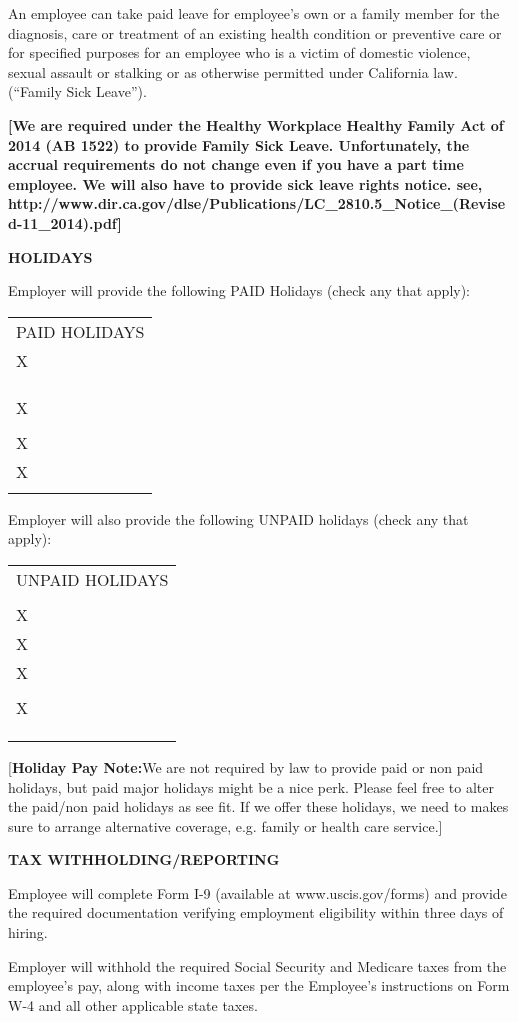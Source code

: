 \documentclass[]{article}
\newcommand{\toprule}{\hrulefill}
\newcommand{\bottomrule}{\hrulefill}
\begin{document}
An employee can take paid leave for employee's own or a family member
for the diagnosis, care or treatment of an existing health condition or
preventive care or for specified purposes for an employee who is a
victim of domestic violence, sexual assault or stalking or as otherwise
permitted under California law. (``Family Sick Leave'').

\textbf{{[}We are required under the Healthy Workplace Healthy Family
Act of 2014 (AB 1522) to provide Family Sick Leave. Unfortunately, the
accrual requirements do not change even if you have a part time
employee. We will also have to provide sick leave rights notice. see,
http://www.dir.ca.gov/dlse/Publications/LC\_2810.5\_Notice\_(Revised-11\_2014).pdf{]}}

\textbf{HOLIDAYS}

Employer will provide the following PAID Holidays (check any that
apply):

\begin{tabular}[c]{@{}l@{}}
\toprule
PAID HOLIDAYS\tabularnewline
X\tabularnewline
\tabularnewline
\tabularnewline
\tabularnewline
X\tabularnewline
\tabularnewline
X\tabularnewline
X\tabularnewline
\bottomrule
\end{tabular}

Employer will also provide the following UNPAID holidays (check any that
apply):

\begin{tabular}[c]{@{}l@{}}
\toprule
UNPAID HOLIDAYS\tabularnewline
\tabularnewline
X\tabularnewline
X\tabularnewline
X\tabularnewline
\tabularnewline
X\tabularnewline
\tabularnewline
\tabularnewline
\bottomrule
\end{tabular}

{[}\textbf{Holiday Pay Note:}We are not required by law to provide paid
or non paid holidays, but paid major holidays might be a nice perk.
Please feel free to alter the paid/non paid holidays as see fit. If we
offer these holidays, we need to makes sure to arrange alternative
coverage, e.g. family or health care service.{]}

\textbf{TAX WITHHOLDING/REPORTING}

Employee will complete Form I-9 (available at www.uscis.gov/forms) and
provide the required documentation verifying employment eligibility
within three days of hiring.

Employer will withhold the required Social Security and Medicare taxes
from the employee's pay, along with income taxes per the Employee's
instructions on Form W-4 and all other applicable state taxes.
\end{document}
